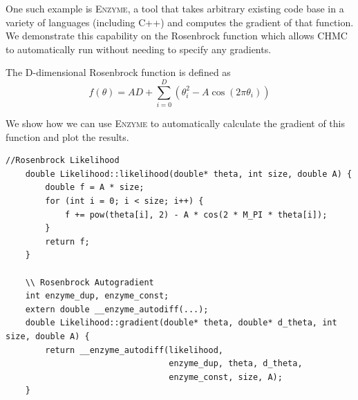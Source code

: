 \documentclass[11pt]{article}
\begin{document}
    One such example is \textsc{Enzyme}, a tool that takes arbitrary existing code base in a variety of languages
    (including C++) and computes the gradient of that function.
    We demonstrate this capability on the Rosenbrock function which allows CHMC to automatically run without needing to
    specify any gradients.

    The D-dimensional Rosenbrock function is defined as
    \begin{equation}\label{eq:rosenbrock}
        f(\theta) = AD + \sum_{i=0}^D\left(\theta_i^2 - A \cos (2 \pi \theta_i) \right)
    \end{equation}

    We show how we can use \textsc{Enzyme} to automatically calculate the gradient of this function and plot the results.

    \begin{widetext}
    \begin{lstlisting}[label={lst:enzyme}]
    //Rosenbrock Likelihood
    double Likelihood::likelihood(double* theta, int size, double A) {
        double f = A * size;
        for (int i = 0; i < size; i++) {
            f += pow(theta[i], 2) - A * cos(2 * M_PI * theta[i]);
        }
        return f;
    }

    \\ Rosenbrock Autogradient
    int enzyme_dup, enzyme_const;
    extern double __enzyme_autodiff(...);
    double Likelihood::gradient(double* theta, double* d_theta, int size, double A) {
        return __enzyme_autodiff(likelihood,
                                 enzyme_dup, theta, d_theta,
                                 enzyme_const, size, A);
    }
    \end{lstlisting}
    \end{widetext}
\end{document}
